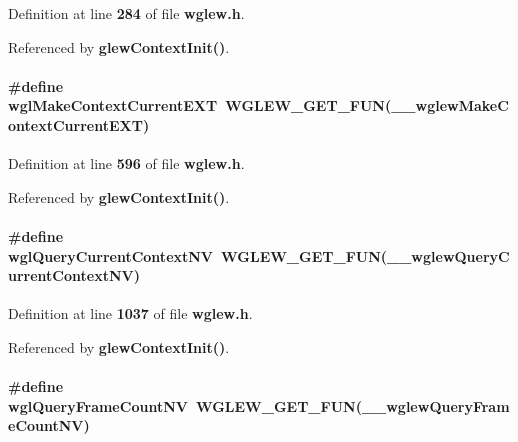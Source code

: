 Definition at line {\bf 284} of file {\bf wglew.\+h}.



Referenced by {\bf glew\+Context\+Init()}.

\paragraph[{wgl\+Make\+Context\+Current\+E\+XT}]{\setlength{\rightskip}{0pt plus 5cm}\#define wgl\+Make\+Context\+Current\+E\+XT~{\bf W\+G\+L\+E\+W\+\_\+\+G\+E\+T\+\_\+\+F\+UN}({\bf \+\_\+\+\_\+wglew\+Make\+Context\+Current\+E\+XT})}\label{wglew_8h_a560bc1294b68b5dcd4a238a69938dcac}


Definition at line {\bf 596} of file {\bf wglew.\+h}.



Referenced by {\bf glew\+Context\+Init()}.

\paragraph[{wgl\+Query\+Current\+Context\+NV}]{\setlength{\rightskip}{0pt plus 5cm}\#define wgl\+Query\+Current\+Context\+NV~{\bf W\+G\+L\+E\+W\+\_\+\+G\+E\+T\+\_\+\+F\+UN}({\bf \+\_\+\+\_\+wglew\+Query\+Current\+Context\+NV})}\label{wglew_8h_a61c2601155d7beb66459b68594c750a6}


Definition at line {\bf 1037} of file {\bf wglew.\+h}.



Referenced by {\bf glew\+Context\+Init()}.

\paragraph[{wgl\+Query\+Frame\+Count\+NV}]{\setlength{\rightskip}{0pt plus 5cm}\#define wgl\+Query\+Frame\+Count\+NV~{\bf W\+G\+L\+E\+W\+\_\+\+G\+E\+T\+\_\+\+F\+UN}({\bf \+\_\+\+\_\+wglew\+Query\+Frame\+Count\+NV})}\label{wglew_8h_a593591ea012fdbd812428edff50665fd}


